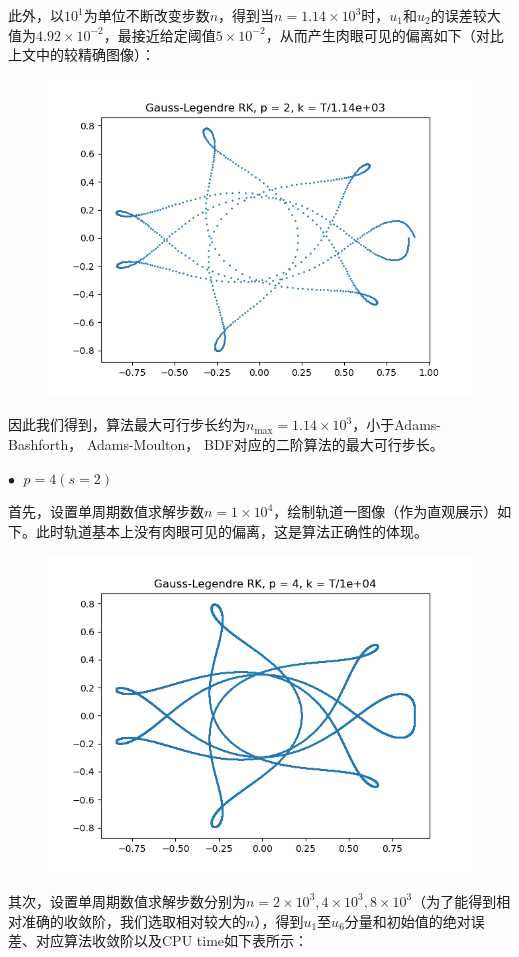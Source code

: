 \documentclass{ctexart}
\begin{document}
\begin{sloppypar}
此外，以$10^1$为单位不断改变步数$n$，得到当$n = 1.14 \times 10^3$时，$u_1$和$u_2$的误差较大值为$4.92 \times 10^{-2}$，最接近给定阈值$5 \times 10^{-2}$，从而产生肉眼可见的偏离如下（对比上文中的较精确图像）：
\begin{figure}[H]
\centering
\includegraphics[scale = 0.45]{./report_src/Figure_69.png}
\end{figure}
因此我们得到，算法最大可行步长约为$n_{\max} = 1.14 \times 10^3$，小于Adams-Bashforth， Adams-Moulton， BDF对应的二阶算法的最大可行步长。

$\bullet \;$ $p = 4(s=2)$

首先，设置单周期数值求解步数$n = 1 \times 10^4$，绘制轨道一图像（作为直观展示）如下。此时轨道基本上没有肉眼可见的偏离，这是算法正确性的体现。
\begin{figure}[H]
\centering
\includegraphics[scale = 0.45]{./report_src/Figure_70.png}
\end{figure}
其次，设置单周期数值求解步数分别为$n = 2 \times 10^3,4 \times 10^3,8 \times 10^3$（为了能得到相对准确的收敛阶，我们选取相对较大的$n$），得到$u_1$至$u_6$分量和初始值的绝对误差、对应算法收敛阶以及CPU time如下表所示：


\end{sloppypar}
\end{document}

